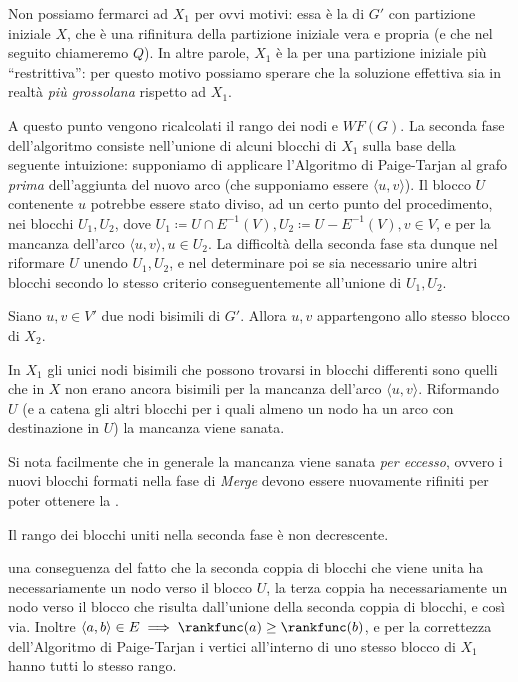 Non possiamo fermarci ad $X_1$ per ovvi motivi: essa è la \rscpnomath di $G'$ con partizione iniziale $X$, che è una rifinitura della partizione iniziale vera e propria (e che nel seguito chiameremo $Q$). In altre parole, $X_1$ è la \rscpnomath per una partizione iniziale più ``restrittiva'': per questo motivo possiamo sperare che la soluzione effettiva sia in realtà \emph{più grossolana} rispetto ad $X_1$.

A questo punto vengono ricalcolati il rango dei nodi e $WF(G)$. La seconda fase dell'algoritmo consiste nell'unione di alcuni blocchi di $X_1$ sulla base della seguente intuizione: supponiamo di applicare l'Algoritmo di Paige-Tarjan al grafo \emph{prima} dell'aggiunta del nuovo arco (che supponiamo essere $\langle u, v\rangle$). Il blocco $U$ contenente $u$ potrebbe essere stato diviso, ad un certo punto del procedimento, nei blocchi $U_1, U_2$, dove $U_1 \coloneqq U \cap E^{-1}(V), U_2 \coloneqq U - E^{-1}(V), v \in V$, e per la mancanza dell'arco $\langle u,v\rangle, u \in U_2$. La difficoltà della seconda fase sta dunque nel riformare $U$ unendo $U_1, U_2$, e nel determinare poi se sia necessario unire altri blocchi secondo lo stesso criterio conseguentemente all'unione di $U_1,U_2$.

\begin{proposition}
    Siano $u,v \in V'$ due nodi bisimili di $G'$. Allora $u,v$ appartengono allo stesso blocco di $X_2$.
\end{proposition}
\begin{proof2}
    In $X_1$ gli unici nodi bisimili che possono trovarsi in blocchi differenti sono quelli che in $X$ non erano ancora bisimili per la mancanza dell'arco $\langle u,v\rangle$. Riformando $U$ (e a catena gli altri blocchi per i quali almeno un nodo ha un arco con destinazione in $U$) la mancanza viene sanata.
\end{proof2}

Si nota facilmente che in generale la mancanza viene sanata \emph{per eccesso}, ovvero i nuovi blocchi formati nella fase di \emph{Merge} devono essere nuovamente rifiniti per poter ottenere la \rscpnomath.

\begin{observation}
    Il rango dei blocchi uniti nella seconda fase è non decrescente.
\end{observation}
\begin{proof2}
    \accente una conseguenza del fatto che la seconda coppia di blocchi che viene unita ha necessariamente un nodo verso il blocco $U$, la terza coppia ha necessariamente un nodo verso il blocco che risulta dall'unione della seconda coppia di blocchi, e così via. Inoltre $\langle a,b \rangle \in E \implies \rankfunc(a) \geq \rankfunc(b)$, e per la correttezza dell'Algoritmo di Paige-Tarjan i vertici all'interno di uno stesso blocco di $X_1$ hanno tutti lo stesso rango.
\end{proof2}

